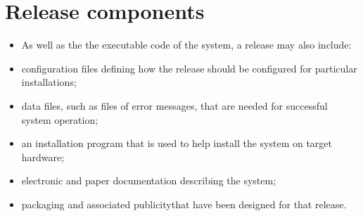 \section{Release components}
\begin{itemize}

\item As well as the the executable code of the system, a release may also include:

   \item configuration files defining how the release should be configured for particular installations;
   \item data files, such as files of error messages, that are needed for successful system operation;
   \item an installation program that is used to help install the system on target hardware;
   \item electronic and paper documentation describing the system;

   \item packaging and associated publicitythat have been designed for that release.

\end{itemize}
